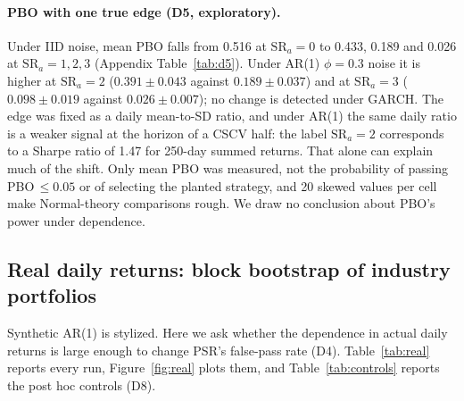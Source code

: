 \documentclass[11pt,a4paper]{article}
\newcommand{\SR}{\mathrm{SR}}
\begin{document}
\paragraph{PBO with one true edge (D5, exploratory).} Under IID noise, mean PBO falls from 0.516 at $\SR_a=0$ to 0.433, 0.189 and 0.026 at $\SR_a=1,2,3$ (Appendix Table~\ref{tab:d5}). Under AR(1) $\phi=0.3$ noise it is higher at $\SR_a=2$ ($0.391\pm0.043$ against $0.189\pm0.037$) and at $\SR_a=3$ ($0.098\pm0.019$ against $0.026\pm0.007$); no change is detected under GARCH. The edge was fixed as a daily mean-to-SD ratio, and under AR(1) the same daily ratio is a weaker signal at the horizon of a CSCV half: the label $\SR_a=2$ corresponds to a Sharpe ratio of 1.47 for 250-day summed returns. That alone can explain much of the shift. Only mean PBO was measured, not the probability of passing PBO$\,\le0.05$ or of selecting the planted strategy, and 20 skewed values per cell make Normal-theory comparisons rough. We draw no conclusion about PBO's power under dependence.

\subsection{Real daily returns: block bootstrap of industry portfolios}\label{sec:res:real}

Synthetic AR(1) is stylized. Here we ask whether the dependence in actual daily returns is large enough to change PSR's false-pass rate (D4). Table~\ref{tab:real} reports every run, Figure~\ref{fig:real} plots them, and Table~\ref{tab:controls} reports the post hoc controls (D8).
\end{document}
